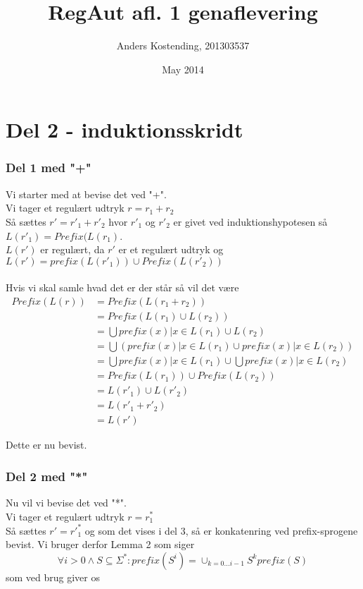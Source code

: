 \documentclass{article}
\title{RegAut afl. 1 genaflevering}
\author{Anders Kostending, 201303537}
\date{May 2014}
\begin{document}
\maketitle

\section{Del 2 - induktionsskridt}
\subsubsection*{Del 1 med "+"}
    Vi starter med at bevise det ved "+".\\
    Vi tager et regulært udtryk $r = r_1 + r_2$\\
    Så sættes $r' = r'_1 + r'_2$ hvor $r'_1$ og $r'_2$ er givet ved induktionshypotesen så $L(r'_1) = Prefix(L(r_1)$.\\
    $L(r')$ er regulært, da $r'$ er et regulært udtryk og $L(r') = prefix(L(r'_1)) \cup Prefix(L(r'_2))$\\
    \\
    Hvis vi skal samle hvad det er der står så vil det være
    \begin{equation*}
        \begin{split}
            Prefix(L(r)) &= Prefix(L(r_1 + r_2)) \\
            &= Prefix(L(r_1) \cup L(r_2)) \\
            &= \bigcup{prefix(x) | x \in L(r_1) \cup L(r_2)} \\
            &= \bigcup(prefix(x) | x \in L(r_1) \cup prefix(x) | x \in L(r_2)) \\
            &= \bigcup prefix(x) | x \in L(r_1) \cup \bigcup prefix(x) | x \in L(r_2) \\
            &= Prefix(L(r_1)) \cup Prefix(L(r_2))\\
            &= L(r'_1) \cup L(r'_2) \\
            &= L(r'_1 + r'_2) \\
            &= L(r')
        \end{split}
    \end{equation*}
    
    
    Dette er nu bevist.

\newpage

\subsubsection*{Del 2 med "*"}
    Nu vil vi bevise det ved "*".\\
    Vi tager et regulært udtryk $r=r_1^*$\\
    Så sættes $r' = r'_1^*$ og som det vises i del 3, så er konkatenring ved prefix-sprogene bevist.
    Vi bruger derfor Lemma 2 som siger $$\forall i>0 \wedge S \subseteq \Sigma^*: prefix(S^i) = \cup_{k = 0...i-1} S^kprefix(S)$$
    som ved brug giver os
    
\end{document}

